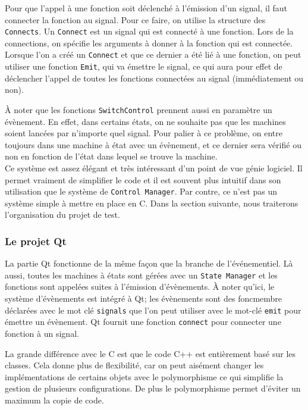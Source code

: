 \documentclass[a4paper]{article}
\begin{document}
Pour que l'appel à une fonction soit déclenché à l'émission d'un signal, il faut
connecter la fonction au signal. Pour ce faire, on utilise la structure des
\verb|Connects|. Un \verb|Connect| est un signal qui est connecté à une
fonction. Lors de la connections, on spécifie les arguments à donner à la
fonction qui est connectée. Lorsque l'on a créé un \verb|Connect| et que ce
dernier a été lié à une fonction, on peut utiliser une fonction \verb|Emit|, qui
va émettre le signal, ce qui aura pour effet de déclencher l'appel de toutes les
fonctions connectées au signal (immédiatement ou non).

À noter que les fonctions \verb|SwitchControl| prennent aussi en paramètre un
évènement. En effet, dans certains états, on ne souhaite pas que les machines
soient lancées par n'importe quel signal. Pour palier à ce problème, on entre
toujours dans une machine à état avec un évènement, et ce dernier sera vérifié
ou non en fonction de l'état dans lequel se trouve la machine.\\

Ce système est assez élégant et très intéressant d'un point de vue génie
logiciel. Il permet vraiment de simplifier le code et il est souvent plus
intuitif dans son utilisation que le système de \verb|Control Manager|. Par
contre, ce n'est pas un système simple à mettre en place en C. Dans la section
suivante, nous traiterons l'organisation du projet de test.

\subsubsection{Le projet Qt}

La partie Qt fonctionne de la même façon que la branche de l'événementiel. Là
aussi, toutes les machines à états sont gérées avec un \verb|State Manager| et
les fonctions sont appelées suites à l'émission d'évènements. À noter qu'ici, le
système d'évènements est intégré à Qt; les évènements sont des \gls{foncmembre}
déclarées avec le mot clé \verb|signals| que l'on peut utiliser avec le mot-clé
\verb|emit| pour émettre un évènement. Qt fournit une fonction \verb|connect|
pour connecter une fonction à un signal.

La grande différence avec le C est que le code C++ est entièrement basé sur les
classes. Cela donne plus de flexibilité, car on peut aisément changer les
implémentations de certains objets avec le polymorphisme ce qui simplifie la
gestion de plusieurs configurations. De plus le polymorphisme permet d'éviter un
maximum la copie de code.
\end{document}
